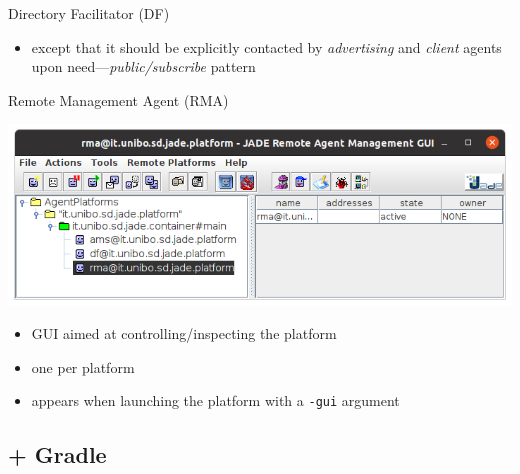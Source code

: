 \documentclass{beamer}\mode<presentation>{\usetheme{AMSCesenaPurpleAndGold}}
\begin{document}
\begin{frame}[c,allowframebreaks]
\begin{block}{Directory Facilitator (DF)}
\begin{itemize}
            \item except that it should be explicitly contacted by \emph{advertising} and \emph{client} agents upon need---\emph{public/subscribe} pattern
        \end{itemize}
    \end{block}
    \begin{block}{Remote Management Agent (RMA)}
    	\begin{center}
    		\includegraphics[width=.8\linewidth]{./res/img/jade_rma}
    	\end{center}
    	\begin{itemize}
    		\item GUI aimed at controlling/inspecting the platform
    		\item one per platform
    		\item appears when launching the platform with a \texttt{-gui} argument
    	\end{itemize}
    \end{block}
\end{frame}

\subsection{\jade{} + Gradle}
\end{document}
